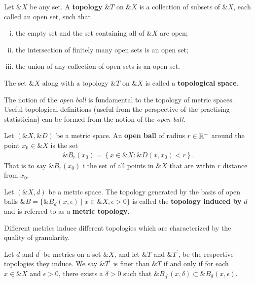 \begin{definition}
  Let $\&X$ be any set. A \textbf{topology} $\&T$ on $\&X$ is a
  collection of subsets of $\&X$, each called an open set, such that
  \begin{enumerate}[(i)]
  \item the empty set and the set containing all of $\&X$ are open;
  \item the intersection of finitely many open sets is an open set;
  \item the union of any collection of open sets is an open set.
  \end{enumerate} The set $\&X$ along with a topology $\&T$ on $\&X$
  is called a \textbf{topological space}.
\end{definition}

The notion of the \textit{open ball} is fundamental to the topology of metric
spaces.  Useful topological definitions (useful from the perspective
of the practising statistician) can be formed from the notion of the
\textit{open ball}.

\begin{definition}
  Let $(\&X, \&D)$ be a metric space. An \textbf{open ball} of radius
  $r \in \mathbb{R}^+$ around the point $x_0 \in \&X$ is the set
  \begin{align}
    \&B_r(x_0) = \left\{ x \in \&X : \&D(x,x_0) < r \right\}.
  \end{align}
  That is to say $\&B_r(x_0)$ i the set of all points in $\&X$ that
  are within $r$ distance from $x_0$.
\end{definition}

\begin{definition}
  \label{def:topology}
  Let $(\&X, d)$ be a metric space.  The topology generated by the
  basis of open balls
  $\&B = \{\&B_d(x, \epsilon) \mid x \in \&X, \epsilon > 0\}$ is
  called the \textbf{topology induced by} $d$ and is referred to as a
  \textbf{metric topology}.
\end{definition}

Different metrics induce different topologies which are characterized
by the quality of granularity.

\begin{theorem}
  Let $d$ and $d^\prime$ be metrics on  a set $\&X$, and let $\&T$ and
  $\&T^\prime$,  be the  respective  topologies they  induce.  We  say
  $\&T^\prime$ is finer than $\&T$ if and only if for each $x \in \&X$
  and  $\epsilon  >  0$,  there  exists  a  $\delta  >  0$  such  that
  $\&B_{d^\prime}(x, \delta) \subset \&B_d(x, \epsilon)$.
\end{theorem}


